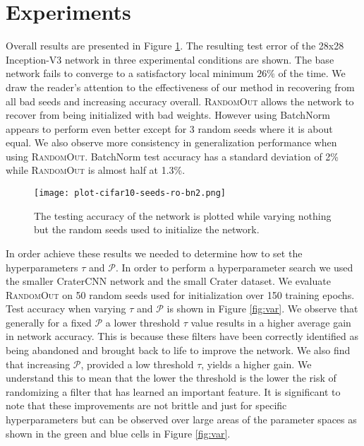 \documentclass{article}
\begin{document}
\section{Experiments}
\label{sec:exp}

Overall results are presented in Figure \ref{fig:varyseed}. The resulting test error of the 28x28 Inception-V3 network in three experimental conditions are shown. The base network fails to converge to a satisfactory local minimum $26\%$ of the time. We draw the reader's attention to the effectiveness of our method in recovering from all bad seeds and increasing accuracy overall. \textsc{RandomOut} allows the network to recover from being initialized with bad weights. However using BatchNorm appears to perform even better except for 3 random seeds where it is about equal. We also observe more consistency in generalization performance when using \textsc{RandomOut}. BatchNorm test accuracy has a standard deviation of 2\% while \textsc{RandomOut} is almost half at 1.3\%. 

\begin{figure}
  \begin{center}
    \texttt{[image: plot-cifar10-seeds-ro-bn2.png]}
     \caption{The testing accuracy of the network is plotted while varying nothing but the random seeds used to initialize the network.}
      \label{fig:varyseed}
  \end{center}
\end{figure}


In order achieve these results we needed to determine how to set the hyperparameters $\tau$ and $\mathcal{P}$. In order to perform a hyperparameter search we used the smaller CraterCNN network and the small Crater dataset. We evaluate \textsc{RandomOut} on 50 random seeds used for initialization over 150 training epochs. Test accuracy when varying $\tau$ and $\mathcal{P}$ is shown in Figure \ref{fig:var}. We observe that generally for a fixed $\mathcal{P}$ a lower threshold $\tau$ value results in a higher average gain in network accuracy. This is because these filters have been correctly identified as being abandoned and brought back to life to improve the network. We also find that increasing $\mathcal{P}$, provided a low threshold $\tau$, yields a higher gain. We understand this to mean that the lower the threshold is the lower the risk of randomizing a filter that has learned an important feature. It is significant to note that these improvements are not brittle and just for specific hyperparameters but can be observed over large areas of the parameter spaces as shown in the green and blue cells in Figure \ref{fig:var}.
\end{document}
